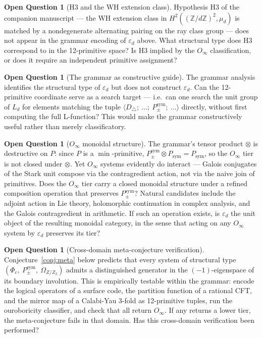 \documentclass[12pt]{article}
\theoremstyle{plain}
\theoremstyle{definition}
\newtheorem{questioninner}[theoreminner]{Open Question}
\theoremstyle{remark}
\newenvironment{question}{\begin{mdframed}[style=defstyle]\begin{questioninner}}{\end{questioninner}\end{mdframed}}
\newcommand{\bZ}{\mathbb{Z}}
\newcommand{\epsd}{\varepsilon_d}
\begin{document}
\begin{question}[H3 and the WH extension class]
Hypothesis H3 of the companion manuscript — the WH extension class in $H^2((\bZ/d\bZ)^2,
\mu_d)$ is matched by a nondegenerate alternating pairing on the ray class group — does not
appear in the grammar encoding of $\epsd$ above. What structural type does H3 correspond to in
the 12-primitive space? Is H3 implied by the $O_\infty$ classification, or does it require an
independent primitive assignment?
\end{question}

\begin{question}[The grammar as constructive guide]
The grammar analysis identifies the structural type of $\epsd$ but does not construct $\epsd$.
Can the 12-primitive coordinate serve as a search target — i.e.\ can one search the unit group
of $L_d$ for elements matching the tuple $\langle D_\triangle;\ \ldots;\ P_{\pm}^{\text{sym}};
\ \ldots \rangle$ directly, without first computing the full L-function? This would make the
grammar constructively useful rather than merely classificatory.
\end{question}

\begin{question}[$O_\infty$ monoidal structure]
\label{q:monoidal}
The grammar's tensor product $\otimes$ is destructive on $P$: since $P$ is a $\min$-primitive,
$P_{\pm}^{\text{sym}} \otimes P_{\text{sym}} = P_{\text{sym}}$, so the $O_\infty$ tier is
not closed under $\otimes$. Yet $O_\infty$ systems evidently do interact — Galois conjugates
of the Stark unit compose via the contragredient action, not via the naive join of primitives.
Does the $O_\infty$ tier carry a closed monoidal structure under a refined composition
operation that preserves $P_{\pm}^{\text{sym}}$? Natural candidates include the adjoint action
in Lie theory, holomorphic continuation in complex analysis, and the Galois contragredient in
arithmetic. If such an operation exists, is $\epsd$ the unit object of the resulting monoidal
category, in the sense that acting on any $O_\infty$ system by $\epsd$ preserves its tier?
\end{question}

\begin{question}[Cross-domain meta-conjecture verification]
\label{q:metaconj}
Conjecture~\ref{conj:meta} below predicts that every system of structural type
$(\Phi_c,\ P_{\pm}^{\text{sym}},\ \Omega_{Z/Z_2})$ admits a distinguished generator in the
$(-1)$-eigenspace of its boundary involution. This is empirically testable within the grammar:
encode the logical operators of a surface code, the partition function of a rational CFT, and
the mirror map of a Calabi-Yau 3-fold as 12-primitive tuples, run the ouroboricity classifier,
and check that all return $O_\infty$. If any returns a lower tier, the meta-conjecture fails in
that domain. Has this cross-domain verification been performed?
\end{question}
\end{document}
